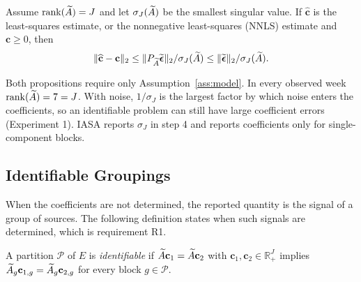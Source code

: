 \begin{proposition}
\label{prop:noise_robust}
Assume \(\operatorname{rank}(\widetilde A)=J\) and let \(\sigma_J(\widetilde A)\) be the smallest
singular value.  If \(\widehat{\mathbf c}\) is the least-squares estimate, or the
nonnegative least-squares (NNLS) estimate and \(\mathbf c\ge0\), then
\begin{equation}
\|\widehat{\mathbf c}-\mathbf c\|_2\le\|P_{\widetilde A}\widetilde{\boldsymbol\epsilon}\|_2/\sigma_J(\widetilde A)
\le\|\widetilde{\boldsymbol\epsilon}\|_2/\sigma_J(\widetilde A).
\label{eq:nnls_noise_bound}
\end{equation}
\end{proposition}

\begin{remark}
Both propositions require only Assumption~\ref{ass:model}.  In every observed week
\(\operatorname{rank}(\widetilde A)=7=J\).  With noise, \(1/\sigma_J\) is the largest factor by
which noise enters the coefficients, so an identifiable problem can still have large
coefficient errors (Experiment 1).  IASA reports \(\sigma_J\) in step 4 and reports coefficients only for
single-component blocks.
\end{remark}

\subsection{Identifiable Groupings}

When the coefficients are not determined, the reported quantity is the signal of a
group of sources.  The following definition states when such signals are determined,
which is requirement R1.

\begin{definition}
\label{def:identifiable_grouping}
A partition \(\mathcal P\) of \(E\) is \emph{identifiable} if
\(\widetilde A\mathbf c_1=\widetilde A\mathbf c_2\) with \(\mathbf c_1,\mathbf c_2\in\mathbb R_+^J\)
implies \(\widetilde A_g\mathbf c_{1,g}=\widetilde A_g\mathbf c_{2,g}\) for every block
\(g\in\mathcal P\).
\end{definition}

